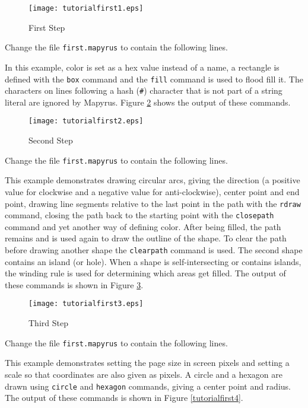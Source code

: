 \begin{figure}[htb]
\texttt{[image: tutorialfirst1.eps]}
\caption{First Step}
\label{tutorialfirst1}
\end{figure}


Change the file \texttt{first.mapyrus} to contain the following lines.



In this example, color is set as a hex value instead of a name,
a rectangle is defined with the \texttt{box} command
and the \texttt{fill} command is used to
flood fill it.
The characters on lines following a hash (\texttt{\#}) character that
is not part of a string literal are ignored by Mapyrus.
Figure \ref{tutorialfirst2} shows the output of these commands.

\begin{figure}[htb]
\texttt{[image: tutorialfirst2.eps]}
\caption{Second Step}
\label{tutorialfirst2}
\end{figure}

Change the file \texttt{first.mapyrus} to contain the following lines.



This example demonstrates drawing circular arcs,
giving the direction (a positive value for clockwise and a negative
value for anti-clockwise), center point and end point,
drawing line segments relative to the last point in the path
with the \texttt{rdraw} command,
closing the path back to the starting point
with the \texttt{closepath} command and
yet another way of defining color.
After being filled, the path remains and is used again to draw the outline
of the shape.
To clear the path before drawing another shape the
\texttt{clearpath}
command is used.
The second shape contains an island (or hole).  When a shape is
self-intersecting or contains islands, the winding rule is
used for determining which areas get filled.
The output of these commands is shown in Figure \ref{tutorialfirst3}.

\begin{figure}[htb]
\texttt{[image: tutorialfirst3.eps]}
\caption{Third Step}
\label{tutorialfirst3}
\end{figure}

Change the file \texttt{first.mapyrus} to contain the following lines.



This example demonstrates setting the page size in
screen pixels and setting a scale so that coordinates
are also given as pixels.
A circle and a hexagon are drawn using \texttt{circle}
and \texttt{hexagon} commands, giving a center point and radius.
The output of these commands is shown in Figure \ref{tutorialfirst4}.

